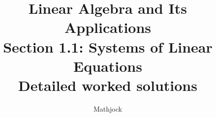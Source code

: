 
\title{\textbf{Linear Algebra and Its Applications}\\[0.3em]Section 1.1: Systems of Linear Equations\\[0.3em]\large Detailed worked solutions}
\author{Mathjock}
\date{}

\maketitle
\bookinfo
\tableofcontents
\clearpage
\renewcommand{\thesection}{1.\arabic{section}}
\renewcommand{\theHsection}{1.\arabic{section}}
\setcounter{section}{0}


